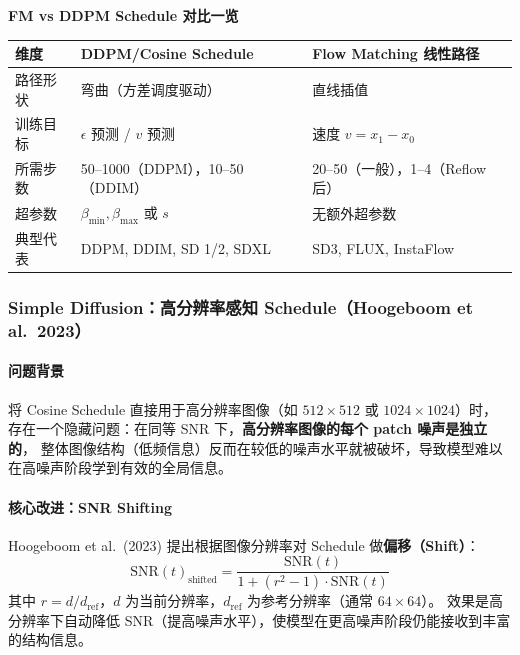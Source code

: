 \begin{summarybox}
\textbf{FM vs DDPM Schedule 对比一览}
\renewcommand{\arraystretch}{1.5}
\begin{tabular}{p{3.5cm}p{5cm}p{5cm}}
\hline
\textbf{维度} & \textbf{DDPM/Cosine Schedule} & \textbf{Flow Matching 线性路径} \\
\hline
路径形状       & 弯曲（方差调度驱动）   & 直线插值 \\
训练目标       & $\epsilon$ 预测 / $v$ 预测 & 速度 $v = x_1 - x_0$ \\
所需步数       & 50--1000（DDPM），10--50（DDIM）& 20--50（一般），1--4（Reflow 后）\\
超参数         & $\beta_{\min}, \beta_{\max}$ 或 $s$ & 无额外超参数 \\
典型代表       & DDPM, DDIM, SD 1/2, SDXL & SD3, FLUX, InstaFlow \\
\hline
\end{tabular}
\end{summarybox}

\subsubsection{Simple Diffusion：高分辨率感知 Schedule（Hoogeboom et al.\ 2023）}

\paragraph{问题背景}

将 Cosine Schedule 直接用于高分辨率图像（如 $512\times512$ 或 $1024\times1024$）时，
存在一个隐藏问题：在同等 SNR 下，\textbf{高分辨率图像的每个 patch 噪声是独立的}，
整体图像结构（低频信息）反而在较低的噪声水平就被破坏，导致模型难以在高噪声阶段学到有效的全局信息。

\paragraph{核心改进：SNR Shifting}

Hoogeboom et al.\ (2023) 提出根据图像分辨率对 Schedule 做\textbf{偏移（Shift）}：
\[
  \mathrm{SNR}(t)_{\text{shifted}} = \frac{\mathrm{SNR}(t)}{1 + (r^2 - 1)\cdot\mathrm{SNR}(t)}
\]
其中 $r = d / d_{\text{ref}}$，$d$ 为当前分辨率，$d_{\text{ref}}$ 为参考分辨率（通常 $64\times64$）。
效果是高分辨率下自动降低 SNR（提高噪声水平），使模型在更高噪声阶段仍能接收到丰富的结构信息。

